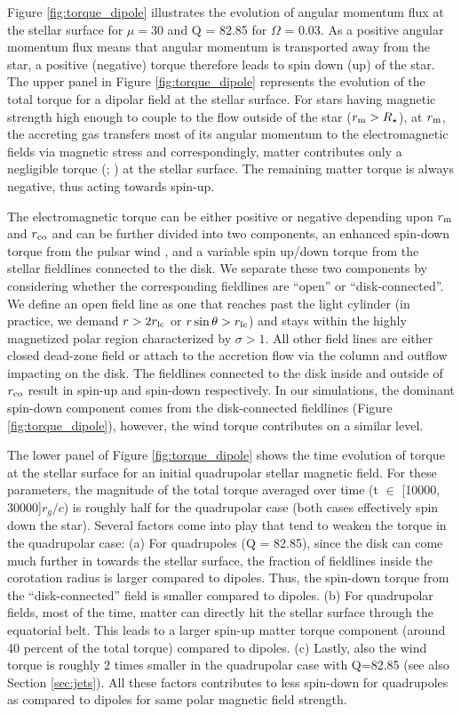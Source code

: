 \documentclass[fleqn,usenatbib]{mnras}
\newcommand{\rstar}{\ensuremath{R_{\star}}}
\begin{document}
Figure \ref{fig:torque_dipole} illustrates the evolution of angular momentum flux at the stellar surface for $\mu = 30$ and Q = 82.85 for $\Omega$ = 0.03. As a positive angular momentum flux means that angular momentum is transported away from the star, a positive (negative) torque therefore leads to spin down (up) of the star. The upper panel in Figure \ref{fig:torque_dipole} represents the evolution of the total torque for a dipolar field at the stellar surface. For stars having magnetic strength high enough to couple to the flow outside of the star ($r_{\rm m} > \rstar$), at $r_{\rm m}$, the accreting gas transfers most of its angular momentum to the electromagnetic fields via magnetic stress and correspondingly, matter contributes only a negligible torque (\citet{Romanova2002}; ) at the stellar surface. The remaining matter torque is always negative, thus acting towards spin-up.
 
The electromagnetic torque can be either positive or negative depending upon $r_{\rm m}$ and $r_{\rm co}$ and can be further divided into two components, an enhanced spin-down torque from the pulsar wind \citep{Parfrey2016}, and a variable spin up/down torque from the stellar fieldlines connected to the disk. We separate these two components by considering whether the corresponding fieldlines are ``open'' or ``disk-connected''.  We define an open field line as one that reaches past the light cylinder (in practice, we demand $r > 2r_{\rm lc}$ or $r \sin\theta > r_{\rm lc}$) and stays within the highly magnetized polar region characterized by $\sigma>1$.  All other field lines are either closed dead-zone field or attach to the accretion flow via the column and outflow impacting on the disk. The fieldlines connected to the disk inside and outside of $r_{\rm co}$ result in spin-up and spin-down respectively. In our simulations, the dominant spin-down component comes from the disk-connected fieldlines (Figure  \ref{fig:torque_dipole}), however, the wind torque contributes on a similar level.  

The lower panel of Figure \ref{fig:torque_dipole} shows the time evolution of torque at the stellar surface for an initial quadrupolar stellar magnetic field. For these parameters, the magnitude of the total torque averaged over time (t $\in$ [10000, 30000]$r_g/c$) is roughly half for the quadrupolar case (both cases effectively spin down the star). Several factors come into play that tend to weaken the torque in the quadrupolar case: (a) For quadrupoles (Q = 82.85), since the disk can come much further in towards the stellar surface, the fraction of fieldlines inside the corotation radius is larger compared to dipoles. Thus, the spin-down torque from the ``disk-connected'' field is smaller compared to dipoles.  
%
(b) For quadrupolar fields, most of the time, matter can directly hit the stellar surface through the equatorial belt. This leads to a larger spin-up matter torque component (around 40 percent of the total torque) compared to dipoles. 
%
(c) Lastly, also the wind torque is roughly $2$ times smaller in the quadrupolar case with Q=82.85 (see also Section \ref{sec:jets}).  
All these factors contributes to less spin-down for quadrupoles as compared to dipoles for same polar magnetic field strength. 
\end{document}
